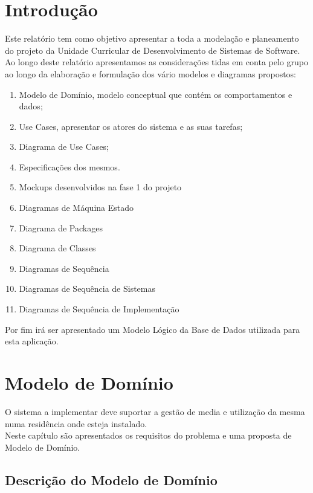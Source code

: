 \documentclass[a4paper]{report}
\begin{document}
\pagebreak

\chapter{Introdução}

Este relatório tem como objetivo apresentar a toda a modelação e planeamento do projeto
da Unidade Curricular de Desenvolvimento de Sistemas de Software.\\
Ao longo deste relatório apresentamos as considerações tidas em conta pelo grupo
ao longo da elaboração e formulação dos vário modelos e diagramas propostos:
\begin{enumerate}
    \item Modelo de Domínio, modelo conceptual que contém os
        comportamentos e dados;
    \item Use Cases, apresentar os atores do sistema e as suas tarefas;
    \item Diagrama de Use Cases;
    \item Especificações dos mesmos.
    \item Mockups desenvolvidos na fase 1 do projeto
    \item Diagramas de Máquina Estado
    \item Diagrama de Packages
    \item Diagrama de Classes
    \item Diagramas de Sequência
    \item Diagramas de Sequência de Sistemas
    \item Diagramas de Sequência de Implementação
\end{enumerate}
Por fim irá ser apresentado um Modelo Lógico da Base de Dados utilizada para
esta aplicação.

\chapter{Modelo de Domínio}

O sistema a implementar deve suportar a gestão de media e utilização da mesma
numa residência onde esteja instalado.\\
Neste capítulo são apresentados os requisitos do problema e uma proposta de 
Modelo de Domínio.

\section{Descrição do Modelo de Domínio}
\end{document}
